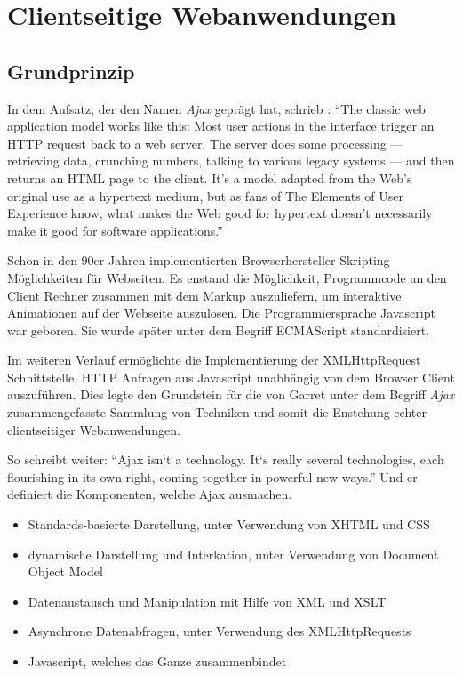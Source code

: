 \section{Clientseitige Webanwendungen}
\label{sec:client_side_web_apps}

\subsection{Grundprinzip}

In dem Aufsatz, der den Namen \emph{Ajax} geprägt hat, schrieb \cite{Garrett:2005}: \enquote{The classic web application model works like this: Most user actions in the interface trigger an HTTP request back to a web server. The server does some processing — retrieving data, crunching numbers, talking to various legacy systems — and then returns an HTML page to the client. It’s a model adapted from the Web’s original use as a hypertext medium, but as fans of The Elements of User Experience know, what makes the Web good for hypertext doesn’t necessarily make it good for software applications.}

Schon in den 90er Jahren implementierten Browserhersteller Skripting Möglichkeiten für Webseiten. Es enstand die Möglichkeit, Programmcode an den Client Rechner zusammen mit dem Markup auszuliefern, um interaktive Animationen auf der Webseite auszulösen. Die Programmiersprache Javascript war geboren. Sie wurde später unter dem Begriff ECMAScript standardisiert.

Im weiteren Verlauf ermöglichte die Implementierung der XMLHttpRequest Schnittstelle, HTTP Anfragen aus Javascript unabhängig von dem Browser Client auszuführen. Dies legte den Grundstein für die von Garret unter dem Begriff \emph{Ajax} zusammengefasste Sammlung von Techniken und somit die Enstehung echter clientseitiger Webanwendungen.

So schreibt \cite{Garrett:2005} weiter: \enquote{Ajax isn`t a technology. It`s really several technologies, each flourishing in its own right, coming together in powerful new ways.} Und er definiert die Komponenten, welche Ajax ausmachen.

\begin{itemize}
\item Standards-basierte Darstellung, unter Verwendung von XHTML und CSS
\item dynamische Darstellung und Interkation, unter Verwendung von Document Object Model
\item Datenaustausch und Manipulation mit Hilfe von XML und XSLT
\item Asynchrone Datenabfragen, unter Verwendung des XMLHttpRequests
\item Javascript, welches das Ganze zusammenbindet
\end{itemize}

